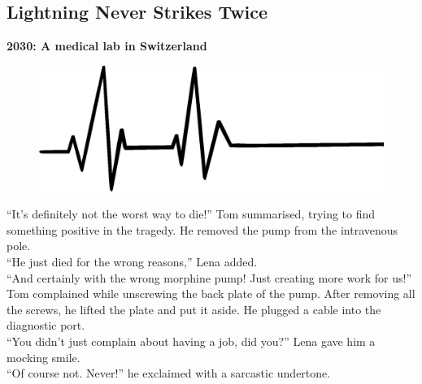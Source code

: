 \documentclass[
  11pt,
]{scrbook}
\begin{document}
\hypertarget{lightning-never-strikes-twice}{%
\subsection*{Lightning Never Strikes Twice}\label{lightning-never-strikes-twice}}


\textbf{2030: A medical lab in Switzerland}

\begin{figure}

{\centering \includegraphics[width=\textwidth]{images/hospital} 

}

\end{figure}

``It's definitely not the worst way to die!'' Tom summarised, trying to find something positive in the tragedy.
He removed the pump from the intravenous pole.\\
``He just died for the wrong reasons,'' Lena added.\\
``And certainly with the wrong morphine pump!
Just creating more work for us!'' Tom complained while unscrewing the back plate of the pump.
After removing all the screws, he lifted the plate and put it aside.
He plugged a cable into the diagnostic port.\\
``You didn't just complain about having a job, did you?'' Lena gave him a mocking smile.\\
``Of course not. Never!'' he exclaimed with a sarcastic undertone.
\end{document}
